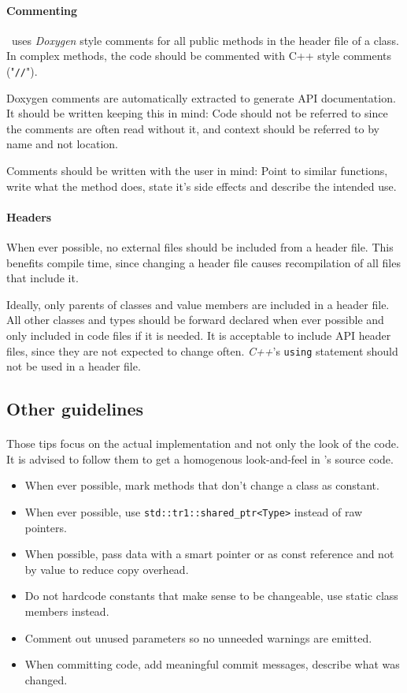 \paragraph{Commenting}
\ER\ uses \textit{Doxygen} style comments for all public methods in the header file of a class.
In complex methods, the code should be commented with C++ style comments ("\texttt{//}").

Doxygen comments are automatically extracted to generate API documentation.
It should be written keeping this in mind:
Code should not be referred to since the comments are often read without it, and context should be referred to by name and not location.

Comments should be written with the user in mind:
Point to similar functions, write what the method does, state it's side effects and describe the intended use.


\paragraph{Headers}
When ever possible, no external files should be included from a header file.
This benefits compile time, since changing a header file causes recompilation of all files that include it.

Ideally, only parents of classes and value members are included in a header file.
All other classes and types should be forward declared when ever possible and only included in code files if it is needed.
It is acceptable to include API header files, since they are not expected to change often.
\textit{C++}'s \texttt{using} statement should not be used in a header file.

\subsection{Other guidelines}
\paragraph{}
Those tips focus on the actual implementation and not only the look of the code.
It is advised to follow them to get a homogenous look-and-feel in \ER's source code.

\begin{itemize}
\item When ever possible, mark methods that don't change a class as constant.
\item When ever possible, use \lstinline{std::tr1::shared_ptr<Type>} instead of raw pointers.
\item When possible, pass data with a smart pointer or as const reference and not by value to reduce copy overhead.
\item Do not hardcode constants that make sense to be changeable, use static class members instead.
\item Comment out unused parameters so no unneeded warnings are emitted.
\item When committing code, add meaningful commit messages, describe what was changed.
\end{itemize}

